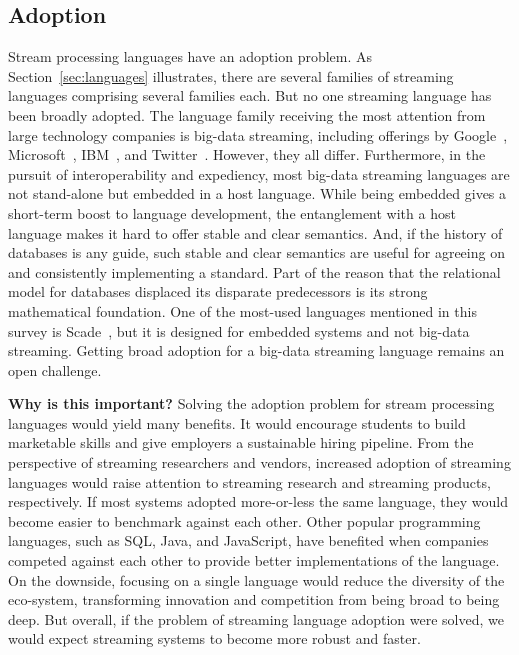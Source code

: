 \subsection{Adoption}\label{sec:adoption} %

Stream processing languages have an adoption problem. As
Section~\ref{sec:languages} illustrates, there are several families of
streaming languages comprising several families each.  But no one
streaming language has been broadly adopted. The language family
receiving the most attention from large technology companies is
big-data streaming, including offerings by
Google~\cite{akidau_et_al_2013}, Microsoft~\cite{ali_et_al_2009},
IBM~\cite{hirzel_schneider_gedik_2017}, and
Twitter~\cite{toshniwal_et_al_2014}. However, they all differ.
Furthermore, in the pursuit of interoperability and expediency, most
big-data streaming languages are not stand-alone but embedded in a
host language. While being embedded gives a short-term boost to
language development, the entanglement with a host language makes it
hard to offer stable and clear semantics. And, if the history of
databases is any guide, such stable and clear semantics are useful for
agreeing on and consistently implementing a standard. Part of the
reason that the relational model for databases displaced its disparate
predecessors is its strong mathematical foundation.  One of the
most-used languages mentioned in this survey is
Scade~\cite{scade_2017}, but it is designed for embedded systems and
not big-data streaming. Getting broad adoption for a big-data
streaming language remains an open challenge.

\textbf{Why is this important?}
Solving the adoption problem for stream processing languages would
yield many benefits. It would encourage students to build marketable
skills and give employers a sustainable hiring pipeline. From the
perspective of streaming researchers and vendors, increased adoption
of streaming languages would raise attention to streaming research and
streaming products, respectively. If most systems adopted more-or-less
the same language, they would become easier to benchmark against each
other. Other popular programming languages, such as SQL, Java, and
JavaScript, have benefited when companies competed against each other
to provide better implementations of the language.  On the downside,
focusing on a single language would reduce the diversity of the
eco-system, transforming innovation and competition from being broad
to being deep. But overall, if the problem of streaming language
adoption were solved, we would expect streaming systems to become more
robust and faster.

